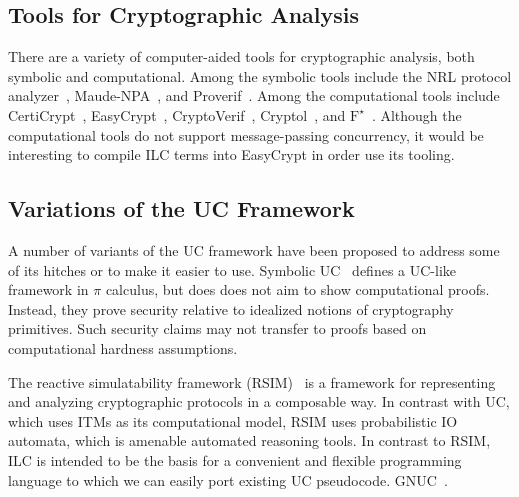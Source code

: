 \subsection{Tools for Cryptographic Analysis}
\label{subsec:tools}
There are a variety of computer-aided tools for cryptographic analysis, both
symbolic and computational. Among the symbolic tools include the NRL protocol
analyzer~\cite{meadows1996nrl}, Maude-NPA~\cite{escobar2009maude}, and
Proverif~\cite{blanchet2010proverif}. Among the computational tools include
CertiCrypt~\cite{barthe2009formal}, EasyCrypt~\cite{barthe2011computer},
CryptoVerif~\cite{blanchet2007cryptoverif}, Cryptol~\cite{lewis2003cryptol}, and
$\text{F}^{\star}$~\cite{swamy2016dependent}.
Although the computational tools do not support message-passing concurrency,
it would be interesting to compile ILC terms into EasyCrypt in order use
its tooling.


\subsection{Variations of the UC Framework}
\label{subsec:uc-variants}
A number of variants of the UC framework have been proposed to address some of
its hitches or to make it easier to use.
Symbolic UC~\cite{bohl2016symbolic} defines a UC-like framework
in $\pi$ calculus, but does does not aim to show computational
proofs. Instead, they prove security relative to idealized notions
of cryptography primitives. Such security claims may not transfer
to proofs based on computational hardness assumptions.

The reactive simulatability framework (RSIM)~\cite{backes2007reactive} is
a framework for representing and analyzing cryptographic protocols in a
composable way. In contrast with UC, which uses ITMs as its computational model,
RSIM uses probabilistic IO automata, which is amenable automated reasoning tools.
In contrast to RSIM, ILC is intended to be the basis for a convenient and
flexible programming language to which we can easily port existing UC
pseudocode. GNUC~\cite{hofheinz2015gnuc}.

